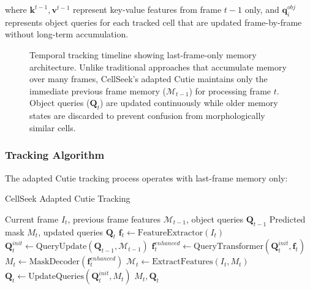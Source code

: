 \documentclass[../cellseek_paper.tex]{subfiles}
\begin{document}
where $\mathbf{k}^{t-1}, \mathbf{v}^{t-1}$ represent key-value features from frame $t-1$ only, and $\mathbf{q}_i^{obj}$ represents object queries for each tracked cell that are updated frame-by-frame without long-term accumulation.

\begin{figure}[h!]
  \centering
  
  \caption{Temporal tracking timeline showing last-frame-only memory architecture. Unlike traditional approaches that accumulate memory over many frames, CellSeek's adapted Cutie maintains only the immediate previous frame memory ($\mathcal{M}_{t-1}$) for processing frame $t$. Object queries ($\mathbf{Q}_t$) are updated continuously while older memory states are discarded to prevent confusion from morphologically similar cells.}
  \label{fig:temporal_timeline}
\end{figure}

\subsubsection{Tracking Algorithm}

The adapted Cutie tracking process operates with last-frame memory only:

\begin{algorithm}[H]
  \caption{CellSeek Adapted Cutie Tracking}
  \begin{algorithmic}[1]
    \REQUIRE Current frame $I_t$, previous frame features $\mathcal{M}_{t-1}$, object queries $\mathbf{Q}_{t-1}$
    \ENSURE Predicted mask $M_t$, updated queries $\mathbf{Q}_t$
    \STATE $\mathbf{f}_t \leftarrow \text{FeatureExtractor}(I_t)$
    \STATE $\mathbf{Q}_t^{init} \leftarrow \text{QueryUpdate}(\mathbf{Q}_{t-1}, \mathcal{M}_{t-1})$
    \STATE $\mathbf{f}_t^{enhanced} \leftarrow \text{QueryTransformer}(\mathbf{Q}_t^{init}, \mathbf{f}_t)$
    \STATE $M_t \leftarrow \text{MaskDecoder}(\mathbf{f}_t^{enhanced})$
    \STATE $\mathcal{M}_t \leftarrow \text{ExtractFeatures}(I_t, M_t)$ 
    \STATE $\mathbf{Q}_t \leftarrow \text{UpdateQueries}(\mathbf{Q}_t^{init}, M_t)$
    \RETURN $M_t, \mathbf{Q}_t$
  \end{algorithmic}
\end{algorithm}
\end{document}
